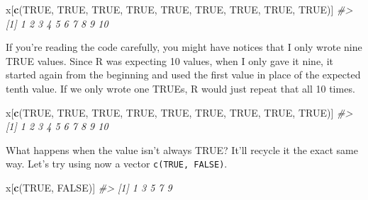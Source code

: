 \documentclass[
  12pt,
]{book}
\newenvironment{Shaded}{\begin{snugshade}}{\end{snugshade}}
\newcommand{\CommentTok}[1]{\textcolor[rgb]{0.37,0.37,0.37}{\textit{#1}}}
\newcommand{\KeywordTok}[1]{\textcolor[rgb]{0.27,0.27,0.27}{\textbf{#1}}}
\newcommand{\NormalTok}[1]{#1}
\newcommand{\OtherTok}[1]{\textcolor[rgb]{0.37,0.37,0.37}{#1}}
\begin{document}
\begin{Shaded}
\begin{Highlighting}[]
\NormalTok{x[}\KeywordTok{c}\NormalTok{(}\OtherTok{TRUE}\NormalTok{, }\OtherTok{TRUE}\NormalTok{, }\OtherTok{TRUE}\NormalTok{, }\OtherTok{TRUE}\NormalTok{, }\OtherTok{TRUE}\NormalTok{, }\OtherTok{TRUE}\NormalTok{, }\OtherTok{TRUE}\NormalTok{, }\OtherTok{TRUE}\NormalTok{, }\OtherTok{TRUE}\NormalTok{)]}
\CommentTok{\#>  [1]  1  2  3  4  5  6  7  8  9 10}
\end{Highlighting}
\end{Shaded}

If you're reading the code carefully, you might have notices that I only wrote nine TRUE values. Since R was expecting 10 values, when I only gave it nine, it started again from the beginning and used the first value in place of the expected tenth value. If we only wrote one TRUEs, R would just repeat that all 10 times.

\begin{Shaded}
\begin{Highlighting}[]
\NormalTok{x[}\KeywordTok{c}\NormalTok{(}\OtherTok{TRUE}\NormalTok{, }\OtherTok{TRUE}\NormalTok{, }\OtherTok{TRUE}\NormalTok{, }\OtherTok{TRUE}\NormalTok{, }\OtherTok{TRUE}\NormalTok{, }\OtherTok{TRUE}\NormalTok{, }\OtherTok{TRUE}\NormalTok{, }\OtherTok{TRUE}\NormalTok{, }\OtherTok{TRUE}\NormalTok{)]}
\CommentTok{\#>  [1]  1  2  3  4  5  6  7  8  9 10}
\end{Highlighting}
\end{Shaded}

What happens when the value isn't always TRUE? It'll recycle it the exact same way. Let's try using now a vector \texttt{c(TRUE,\ FALSE)}.

\begin{Shaded}
\begin{Highlighting}[]
\NormalTok{x[}\KeywordTok{c}\NormalTok{(}\OtherTok{TRUE}\NormalTok{, }\OtherTok{FALSE}\NormalTok{)]}
\CommentTok{\#> [1] 1 3 5 7 9}
\end{Highlighting}
\end{Shaded}
\end{document}
